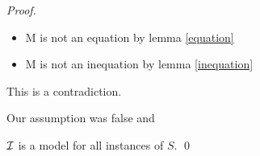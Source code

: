 \begin{proof}
        \begin{itemize}
            \item M is not an equation by lemma \ref{equation}
            \item M is not an inequation by lemma \ref{inequation}
        \end{itemize}

        This is a contradiction.\hfill
        \vspace{0.7em}

        Our assumption was false and

        $\mathcal{I}$ is a model for all instances of $S$.
        \hfill\qed
    \end{proof}



